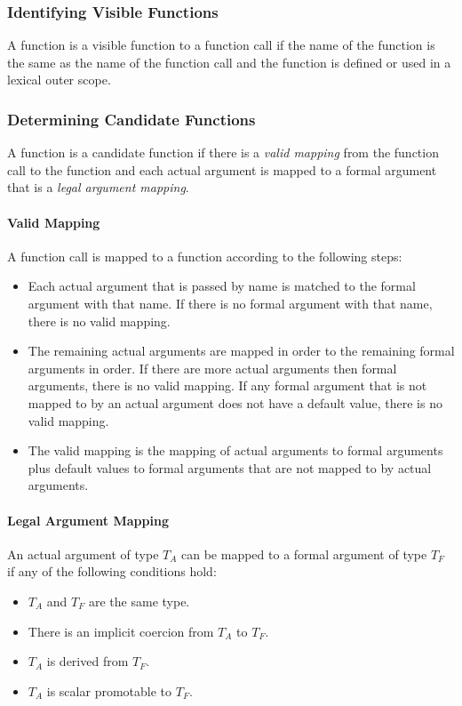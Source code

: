 \subsubsection{Identifying Visible Functions}
\label{Identifying_Visible_Functions}

A function is a visible function to a function call if the name of the
function is the same as the name of the function call and the function
is defined or used in a lexical outer scope.

\subsubsection{Determining Candidate Functions}
\label{Determining_Candidate_Functions}

A function is a candidate function if there is a {\em valid mapping}
from the function call to the function and each actual argument is
mapped to a formal argument that is a {\em legal argument mapping}.

\paragraph{Valid Mapping}

A function call is mapped to a function according to the following
steps:
\begin{itemize}
\item
Each actual argument that is passed by name is matched to the formal
argument with that name.  If there is no formal argument with that
name, there is no valid mapping.
\item
The remaining actual arguments are mapped in order to the remaining
formal arguments in order.  If there are more actual arguments then
formal arguments, there is no valid mapping.  If any formal argument
that is not mapped to by an actual argument does not have a default
value, there is no valid mapping.
\item
The valid mapping is the mapping of actual arguments to formal
arguments plus default values to formal arguments that are not mapped
to by actual arguments.
\end{itemize}

\paragraph{Legal Argument Mapping}

An actual argument of type $T_A$ can be mapped to a formal argument of
type $T_F$ if any of the following conditions hold:
\begin{itemize}
\item $T_A$ and $T_F$ are the same type.
\item There is an implicit coercion from $T_A$ to $T_F$.
\item $T_A$ is derived from $T_F$.
\item $T_A$ is scalar promotable to $T_F$.
\end{itemize}

